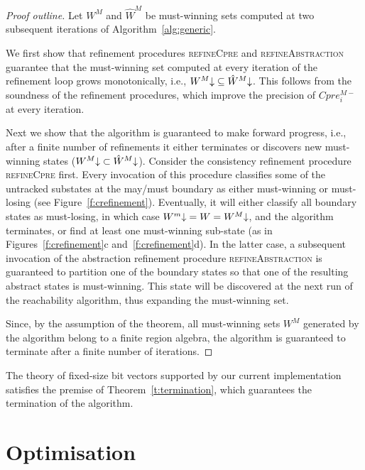 \begin{proof}[Proof outline]

Let $W^M$ and $\hat{W}^M$ be must-winning sets computed at two subsequent iterations of Algorithm~\ref{alg:generic}.  

We first show that refinement procedures \textsc{refineCpre} and \textsc{refineAbstraction} guarantee that the must-winning set computed at every iteration of the refinement loop grows monotonically, i.e., $W^M\mathord{\downarrow} \subseteq \hat{W}^M\mathord{\downarrow}$.  This follows from the soundness of the refinement procedures, which improve the precision of $Cpre_i^{M-}$ at every iteration. 

Next we show that the algorithm is guaranteed to make forward progress, i.e., after a finite number of refinements it either terminates or discovers new must-winning states ($W^M\mathord{\downarrow} \subset \hat{W}^M\mathord{\downarrow}$).  Consider the consistency refinement procedure \textsc{refineCpre} first.  Every invocation of this procedure classifies some of the untracked substates at the may/must boundary as either must-winning or must-losing (see Figure~\ref{f:crefinement}).  Eventually, it will either classify all boundary states as must-losing, in which case $W^m\mathord{\downarrow} = W = W^M\mathord{\downarrow}$, and the algorithm terminates, or find at least one must-winning sub-state (as in Figures~\ref{f:crefinement}c and~\ref{f:crefinement}d).  In the latter case, a subsequent invocation of the abstraction refinement procedure \textsc{refineAbstraction} is guaranteed to partition one of the boundary states so that one of the resulting abstract states is must-winning.  This state will be discovered at the next run of the reachability algorithm, thus expanding the must-winning set.

Since, by the assumption of the theorem, all must-winning sets $W^M$ generated by the algorithm belong to a finite region algebra, the algorithm is guaranteed to terminate after a finite number of iterations.

\end{proof}

The theory of fixed-size bit vectors supported by our current implementation satisfies the premise of Theorem~\ref{t:termination}, which guarantees the termination of the algorithm.

\section{Optimisation}
\label{sec:optimisation}

